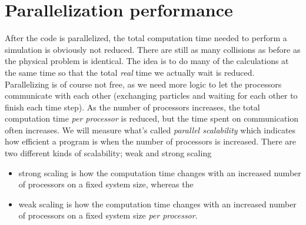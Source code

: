 \section{Parallelization performance}
\label{sec:dsmc_parallelization_performance}
After the code is parallelized, the total computation time needed to perform a simulation is obviously not reduced. There are still as many collisions as before as the physical problem is identical. The idea is to do many of the calculations at the same time so that the total \textit{real} time we actually wait is reduced. Parallelizing is of course not free, as we need more logic to let the processors communicate with each other (exchanging particles and waiting for each other to finish each time step). As the number of processors increases, the total computation time \textit{per processor} is reduced, but the time spent on communication often increases. We will measure what's called \textit{parallel scalability} which indicates how efficient a program is when the number of processors is increased. There are two different kinds of scalability; weak and strong scaling
\begin{itemize}
	\item strong scaling is how the computation time changes with an increased number of processors on a fixed system size, whereas the
	\item weak scaling is how the computation time changes with an increased number of processors on a fixed system size \textit{per processor}.
\end{itemize}
